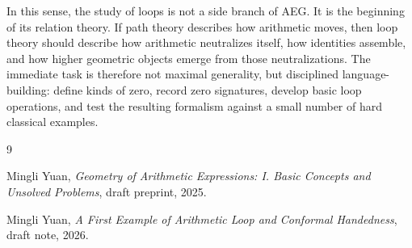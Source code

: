 \documentclass[11pt]{article}
\newcommand{\AEG}{AEG}
\begin{document}
In this sense, the study of loops is not a side branch of \AEG{}. It is the beginning of its relation theory. If path theory describes how arithmetic moves, then loop theory should describe how arithmetic neutralizes itself, how identities assemble, and how higher geometric objects emerge from those neutralizations. The immediate task is therefore not maximal generality, but disciplined language-building: define kinds of zero, record zero signatures, develop basic loop operations, and test the resulting formalism against a small number of hard classical examples.

\begin{thebibliography}{9}

Mingli Yuan,
\emph{Geometry of Arithmetic Expressions: I. Basic Concepts and Unsolved Problems},
draft preprint, 2025.

Mingli Yuan,
\emph{A First Example of Arithmetic Loop and Conformal Handedness},
draft note, 2026.

\end{thebibliography}
\end{document}
